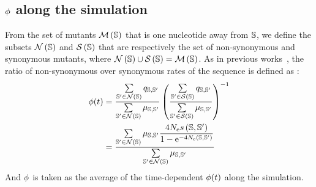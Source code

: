 \subsection{\texorpdfstring{$\phi$}{φ} along the simulation}
From the set of mutants $\mathcal{M}\left(\mathbb{S}\right)$ that is one nucleotide away from $\mathbb{S}$, we define the subsets $\mathcal{N}\left(\mathbb{S}\right)$ and $\mathcal{S}\left(\mathbb{S}\right)$ that are respectively the set of non-synonymous and synonymous mutants, where $\mathcal{N}\left(\mathbb{S}\right) \cup \mathcal{S}\left(\mathbb{S}\right) = \mathcal{M}\left(\mathbb{S}\right)$.
As in previous works~\citep{Spielman2015, DosReis2015, Jones2016}, the ratio of non-synonymous over \gls{synonymous} rates of the sequence is defined as :
\begin{align}
    \phi(t) &= \dfrac{\sum\limits_{\mathbb{S}' \in \mathcal{N}\left(\mathbb{S}\right)} q_{\mathbb{S}, \mathbb{S}'}}{\sum\limits_{\mathbb{S}' \in \mathcal{N}\left(\mathbb{S}\right)} \mu_{\mathbb{S}, \mathbb{S}'}} \left( \dfrac{\sum\limits_{\mathbb{S}' \in \mathcal{S}\left(\mathbb{S}\right)} q_{\mathbb{S}, \mathbb{S}'}}{\sum\limits_{\mathbb{S}' \in \mathcal{S}\left(\mathbb{S}\right)} \mu_{\mathbb{S}, \mathbb{S}'}} \right)^{-1}\\
    &= \dfrac{\sum\limits_{\mathbb{S}' \in \mathcal{N}\left(\mathbb{S}\right)} \mu_{\mathbb{S}, \mathbb{S}'} \dfrac{4 N_{\mathrm{e}} s \left( \mathbb{S},\mathbb{S}'\right)}{{1 - \mathrm{e}^{-4 N_{\mathrm{e}} \left( \mathbb{S},\mathbb{S}'\right)} }}}{\sum\limits_{\mathbb{S}' \in \mathcal{N}\left(\mathbb{S}\right)} \mu_{\mathbb{S}, \mathbb{S}'}}
\end{align}
And $\phi$ is taken as the average of the time-dependent $\phi(t)$ along the simulation.
